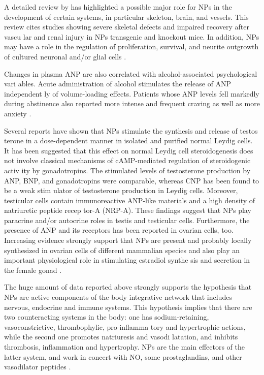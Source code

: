\documentclass[14pt,a4paper,onecolumn]{extarticle}
\begin{document}
A  detailed review by \citep{107} has highlighted a possible major role for NPs in the development of certain systems, in particular skeleton, brain, and vessels. This review cites  studies showing severe skeletal defects and impaired recovery after vascu lar and renal injury in NPs transgenic and knockout mice. In addition, NPs may have a role in the regulation of proliferation, survival, and neurite outgrowth of cultured neuronal and/or glial cells \citep{107}.



Changes in plasma ANP are also correlated with alcohol-associated psychological vari ables. Acute administration of alcohol stimulates the release of ANP independent ly of volume-loading effects. Patients whose ANP levels fell markedly during abstinence also reported more intense and frequent craving as well as more anxiety \citep{108}.



Several reports have shown that NPs stimulate the synthesis and release of testos terone in a dose-dependent manner in isolated and purified normal Leydig cells. It has been suggested that this effect on normal Leydig cell steroidogenesis does not involve classical mechanisms of cAMP-mediated regulation of steroidogenic activ ity by gonadotropins. The stimulated levels of testosterone production by ANP, BNP, and gonadotropins were comparable, whereas CNP has been found to be a weak stim ulator of testosterone production in Leydig cells. Moreover, testicular cells contain immunoreactive ANP-like materials and a high density of natriuretic peptide recep tor-A (NRP-A). These findings suggest that NPs play paracrine and/or autocrine roles in testis and testicular cells. Furthermore, the presence of ANP and its receptors has been reported in ovarian cells, too. Increasing evidence strongly support that NPs are present and probably locally synthesized in ovarian cells of different mammalian species and also play an important physiological role in stimulating estradiol synthe sis and secretion in the female gonad \citep{112}.



The huge amount of data reported above strongly supports the hypothesis that NPs are active components of the body integrative network that includes nervous, endocrine and immune systems. This hypothesis implies that there are two counteracting systems in the body: one has sodium-retaining, vasoconstrictive, thrombophylic, pro-inflamma tory and hypertrophic actions, while the second one promotes natriuresis and vasodi latation, and inhibits thrombosis, inflammation and hypertrophy. NPs are the main effectors of the latter system, and work in concert with NO, some prostaglandins, and other vasodilator peptides \citep{119} \citep{120}.
\end{document}
